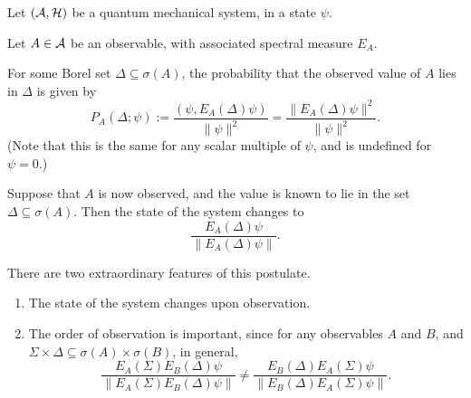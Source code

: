 \begin{postulate}
\label{pos1}
    Let $(\mathcal{A},\mathcal{H})$ be a quantum mechanical system, in a state $\psi$. 
    
    Let $A \in \mathcal{A}$ be an observable, with associated spectral measure $E_A$. 
    
    For some Borel set $\Delta \subseteq \sigma(A)$, the probability 
    that the observed value of $A$ lies in $\Delta$ is given by
    \begin{equation*}
        P_A(\Delta;\psi) := \frac{(\psi,E_A(\Delta)\psi)}{\|\psi\|^2} = \frac{\|E_A(\Delta)\psi\|^2}{\|\psi\|^2}.
    \end{equation*}
    (Note that this is the same for any scalar multiple of $\psi$, and is undefined
    for $\psi = 0$.)
    
    Suppose that $A$ is now observed, and the value is known to lie
    in the set $\Delta \subseteq \sigma(A)$. Then the state
    of the system changes to
    \begin{equation*}
        \frac{E_A(\Delta)\psi}{\|E_A(\Delta)\psi\|}.
    \end{equation*}
\end{postulate}

\begin{remark}
    There are two extraordinary features of this postulate.
    \begin{enumerate}
        \item{} The state of the system changes upon observation.
        \item{} The order of observation is important, since
        for any observables $A$ and $B$, and $\Sigma \times \Delta \subseteq \sigma(A)\times\sigma(B)$, 
        in general,
        \begin{equation*}
            \frac{E_A(\Sigma)E_B(\Delta)\psi}{\|E_A(\Sigma)E_B(\Delta)\psi\|} \neq \frac{E_B(\Delta)E_A(\Sigma)\psi}{\|E_B(\Delta)E_A(\Sigma)\psi\|}.
        \end{equation*}
    \end{enumerate}
\end{remark}

